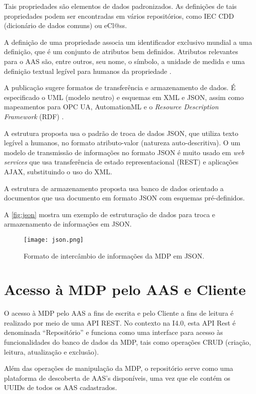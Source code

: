 	Tais propriedades são elementos de dados padronizados. As definições de tais propriedades podem ser encontradas em vários repositórios, como IEC CDD (dicionário de dados comuns) ou eCl@ss.
	
	A definição de uma propriedade associa um identificador exclusivo mundial a uma definição, que é um conjunto de atributos bem definidos. Atributos relevantes para o AAS são, entre outros, seu nome, o símbolo, a unidade de medida e uma definição textual legível para humanos da propriedade \cite{bader2019aas}.
	
	A publicação sugere formatos de transferência e armazenamento de dados. É especificado o UML (modelo neutro) e esquemas em XML e JSON, assim como mapeamentos para OPC UA, AutomationML e o \textit{Resource Description Framework} (RDF) \cite{plattform2019detailsaas}.
	
	A estrutura proposta usa o padrão de troca de dados JSON, que utiliza texto legível a humanos, no formato atributo-valor (natureza auto-descritiva). O um modelo de transmissão de informações no formato JSON é muito usado em \textit{web services} que usa transferência de estado representacional (REST) e aplicações AJAX, substituindo o uso do XML.
	
	A estrutura de armazenamento proposta usa banco de dados orientado a documentos que usa documento em formato JSON com esquemas pré-definidos.
	
	A \autoref{fig:json} mostra um exemplo de estruturação de dados para troca e armazenamento de informações em JSON.
	
	\begin{figure}[htb]
		\centering
		\caption{Formato de intercâmbio de informações da MDP em JSON.}
		\label{fig:json}
		\texttt{[image: json.png]}
  \end{figure}
  

\section{Acesso à MDP pelo AAS e Cliente}
	\label{comunicacao-CS}
	
	O acesso à MDP pelo AAS a fins de escrita e pelo Cliente a fins de leitura é realizado por meio de uma API REST. No contexto na I4.0, esta API Rest é denominada ``Repositório'' e funciona como uma interface para acesso às funcionalidades do banco de dados da MDP, tais como operações CRUD (criação, leitura, atualização e exclusão).
	
	Além das operações de manipulação da MDP, o repositório serve como uma plataforma de descoberta de AAS's disponíveis, uma vez que ele contém os UUIDs de todos os AAS cadastrados.
	

